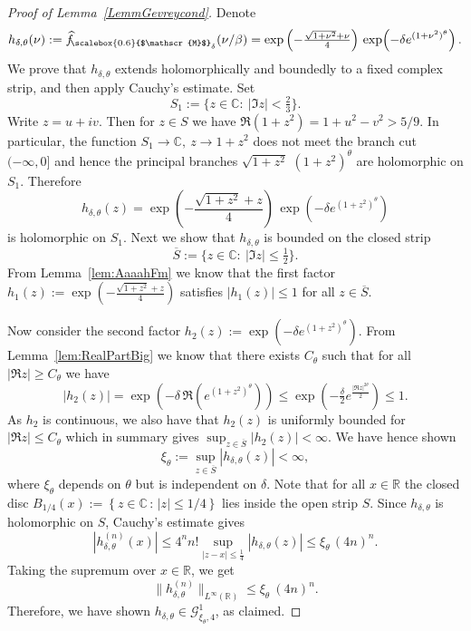 \documentclass[11pt]{amsart}
\newcommand{\1}{\mathbbm{1}}
\newcommand{\C}{\mathbb{C}}
\newcommand{\hatfMdelta}{\widehat{f}_{\!\scalebox{0.6}{$\mathscr{M}$}_\delta}}
\theoremstyle{plain}
\theoremstyle{definition}
\theoremstyle{remark}
\numberwithin{equation}{section}
\begin{document}
\begin{proof}[Proof of Lemma~\ref{LemmGevreycond}]
Denote $$h_{\delta,\theta}(\nu):= \hatfMdelta(\nu/\beta) = \exp\left(-\tfrac{\sqrt{1+\nu^2}+\nu}{4}\right)\,
\exp\!\left(-\delta e^{(1+\nu^2)^\theta}\right). $$
We prove that \(h_{\delta,\theta}\) extends holomorphically and boundedly to a fixed complex strip, and then apply Cauchy's estimate. Set
\[
S_1:=\{z\in\mathbb C:\ |\Im z|<\tfrac 23\}.
\]
Write \(z=u+iv\). Then for \(z\in S\) we have $
\Re(1+z^2)=1+u^2-v^2 > 5/9$. In particular, the function $S_1\to \C,\ z\to 1+z^2$ does not meet the branch cut \((-\infty,0]\) and hence the principal branches
$
\sqrt{1+z^2}$
$(1+z^2)^\theta$
are holomorphic on \(S_1\). Therefore
\[
h_{\delta,\theta}(z)
=
\exp\!\left(-\frac{\sqrt{1+z^2}+z}{4}\right)\,
\exp\!\left(-\delta e^{(1+z^2)^\theta}\right)
\]
is holomorphic on \(S_1\). Next we show that \(h_{\delta,\theta}\) is bounded on the closed strip
\[
\overline S:=\{z\in\mathbb C:\ |\Im z|\le \tfrac12\}.
\]
From Lemma~\ref{lem:AaaahFm} we know that the first factor
\(
h_1(z):=\exp\!\left(-\frac{\sqrt{1+z^2}+z}{4}\right)
\)
satisfies 
$
|h_1(z)|\le 1$ for all $z\in \overline S$.

Now consider the second factor
$
h_2(z):=\exp\!\left(-\delta e^{(1+z^2)^\theta}\right).
$
From Lemma~\ref{lem:RealPartBig} we know that there exists $C_\theta$ such that for all $|\Re z| \ge C_\theta$ we have
\[
|h_2(z)|
=
\exp\!\left(-\delta\,\Re\!\left(e^{(1+z^2)^\theta}\right)\right)
\le
\exp\!\left(-\tfrac{\delta}{2}e^{\frac{|\Re z|^{2\theta}}{2}}\right) \le 1.
\]
As $h_2$ is continuous, we also have that $h_2(z)$ is uniformly bounded for $|\Re z|\le C_\theta$ which in summary gives $\sup_{z\in \overline S} |h_2(z)|<\infty.$ We have hence shown
\[
\xi_{\theta}:=\sup_{z\in \overline S}|h_{\delta,\theta}(z)|<\infty,
\]
where $\xi_{\theta}$ depends on $\theta$ but is independent on $\delta.$
Note that for all \(x\in\mathbb R\) the closed disc
$
B_{1/4}(x) := \left\{z\in\C\, :\, |z|\le 1/4 \right\}$
lies inside the open strip \(S\). Since \(h_{\delta,\theta}\) is holomorphic on \(S\), Cauchy's estimate gives
\[
|h_{\delta,\theta}^{(n)}(x)|
\le
4^n n!
\sup_{|z-x|\le \frac14}|h_{\delta,\theta}(z)|
\le
\xi_{\theta}\,(4n)^n.
\]
Taking the supremum over \(x\in\mathbb R\), we get
\[
\|h_{\delta,\theta}^{(n)}\|_{L^\infty(\mathbb R)}
\le \xi_{\theta}\ (4n)^n.
\]
Therefore, we have shown \(h_{\delta,\theta}\in \mathcal G^1_{\xi_{\theta},4}\), as claimed.


\end{proof}
\end{document}
